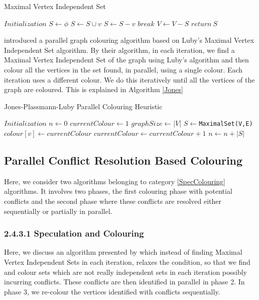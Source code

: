 \documentclass[MTech]{iitmdiss}
\begin{document}
\begin{algorithm}
\caption{Maximal Vertex Independent Set}\label{Luby}
\begin{algorithmic}[1]
\State $\textit{Initialization}$
\State $S \gets \phi$
\State $S \gets S \cup v$
\State $S \gets S - v$
\State $\textit{break}$
\EndIf
\EndFor
\EndFor
\State $V \gets V - S$
\State $\textit{return} \: S$
\EndProcedure
\end{algorithmic}
\end{algorithm}

\citet{Jones:1993:PGC:153109.153119} introduced a parallel graph colouring algorithm based on Luby's Maximal Vertex Independent Set algorithm. By their algorithm, in each iteration, we find a Maximal Vertex Independent Set of the graph using Luby's algorithm and then colour all the vertices in the set found, in parallel, using a single colour. Each iteration uses a different colour. We do this iteratively until all the vertices of the graph are coloured. This is explained in Algorithm \ref{Jones}

\begin{algorithm}
\caption{Jones-Plassmann-Luby Parallel Colouring Heuristic}\label{Jones}
\begin{algorithmic}[1]
\State $\textit{Initialization}$
\State $n \gets 0$
\State $currentColour \gets 1$
\State $graphSize \gets |V|$
\State $S \gets $\verb+MaximalSet(V,E)+
\State $colour[v] \gets currentColour$
\EndFor
\State $currentColour \gets currentColour+1$
\State $n \gets n+|S|$
\EndWhile
\EndProcedure
\end{algorithmic}
\end{algorithm}

\subsection{Parallel Conflict Resolution Based Colouring}
Here, we consider two algorithms belonging to category \ref{SpecColouring} algorithms. It involves two phases, the first colouring phase with potential conflicts and the second phase where these conflicts are resolved either sequentially or partially in parallel.
\subsubsection{2.4.3.1 \: \: Speculation and Colouring}
Here, we discuss an algorithm presented by \citet{CPE:CPE528} which instead of finding Maximal Vertex Independent Sets in each iteration, relaxes the condition, so that we find and colour sets which are not really independent sets in each iteration possibly incurring conflicts. These conflicts are then identified in parallel in phase 2. In phase 3, we re-colour the vertices identified with conflicts sequentially.
\end{document}

